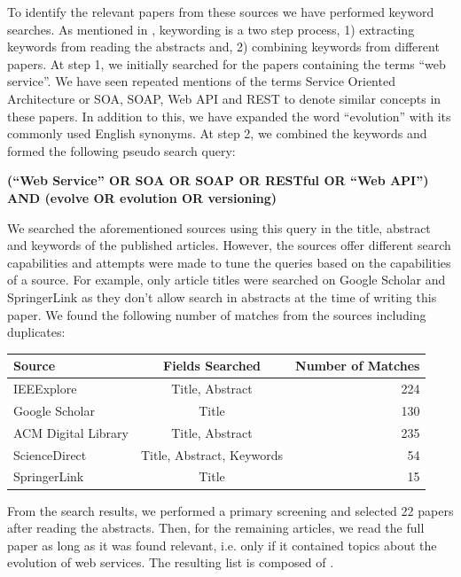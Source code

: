 \documentclass[runningheads,a4paper]{llncs}
\begin{document}
To identify the relevant papers from these sources we have performed keyword searches. As mentioned in \cite{petersen2008systematic}, keywording is a two step process, 1) extracting keywords from reading the abstracts and, 2) combining keywords from different papers. At step 1, we initially searched for the papers containing the terms ``web service''. We have seen repeated mentions of the terms Service Oriented Architecture or SOA, SOAP, Web API and REST to denote similar concepts in these papers. In addition to this, we have expanded the word ``evolution'' with its commonly used English synonyms. At step 2, we combined the keywords and formed the following pseudo search query:

\textbf{(``Web Service'' OR SOA OR SOAP OR RESTful OR ``Web API'')  AND (evolve OR evolution OR versioning)}

We searched the aforementioned sources using this query in the title, abstract and keywords of the published articles. However, the sources offer different search capabilities and attempts were made to tune the queries based on the capabilities of a source. For example, only article titles were searched on Google Scholar and SpringerLink as they don't allow search in abstracts at the time of writing this paper. We found the following number of matches from the sources including duplicates:

\begin{tabular}{l c r}
  Source & Fields Searched & Number of Matches \\
  \hline
  IEEExplore & Title, Abstract & 224 \\
  Google Scholar & Title & 130 \\
  ACM Digital Library & Title, Abstract & 235 \\
  ScienceDirect & Title, Abstract, Keywords & 54 \\
  SpringerLink & Title & 15
\end{tabular}

From the search results, we performed a primary screening and selected 22 papers after reading the abstracts. Then, for the remaining articles, we read the full paper as long as it was found relevant, i.e. only if it contained topics about the evolution of web services. The resulting list is composed of \cite{kitchenham2007guidelines} \cite{petersen2008systematic} \cite{treiber2009analyzing} \cite{borovskiy2008evolution} \cite{lublinsky2007versioning} \cite{laskey2008considerations} \cite{wilde2004semantically} \cite{fang2007version} \cite{leitner2008end} \cite{mangler2010origin} \cite{kaminski2006design} \cite{le2008synchronizing} \cite{aversano2005visualizing}.
\end{document}
